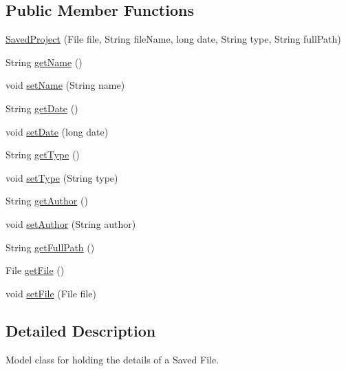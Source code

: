 \subsection*{Public Member Functions}
\begin{DoxyCompactItemize}
\item 
\hyperlink{classorg_1_1buildmlearn_1_1toolkit_1_1model_1_1SavedProject_adb8e49d8331062fbca7e82d88c636d5f}{Saved\-Project} (File file, String file\-Name, long date, String type, String full\-Path)
\item 
String \hyperlink{classorg_1_1buildmlearn_1_1toolkit_1_1model_1_1SavedProject_a80e2d2daf80abb1f4e896c681ecb93bc}{get\-Name} ()
\item 
void \hyperlink{classorg_1_1buildmlearn_1_1toolkit_1_1model_1_1SavedProject_a2e1f111a512798fb8b1acf992fcd5240}{set\-Name} (String name)
\item 
String \hyperlink{classorg_1_1buildmlearn_1_1toolkit_1_1model_1_1SavedProject_a1e9523ff7c4ef3db7829059215ff70de}{get\-Date} ()
\item 
void \hyperlink{classorg_1_1buildmlearn_1_1toolkit_1_1model_1_1SavedProject_a3b47ee46e4cbea68adee68b64c2ec079}{set\-Date} (long date)
\item 
String \hyperlink{classorg_1_1buildmlearn_1_1toolkit_1_1model_1_1SavedProject_a5f64a7ad50e81ee2757e986da3c4e0a8}{get\-Type} ()
\item 
void \hyperlink{classorg_1_1buildmlearn_1_1toolkit_1_1model_1_1SavedProject_a752a07c55de9337e3220a1ffdb4faf50}{set\-Type} (String type)
\item 
String \hyperlink{classorg_1_1buildmlearn_1_1toolkit_1_1model_1_1SavedProject_ae2d5fe5caab78e44afee598b57e758fd}{get\-Author} ()
\item 
void \hyperlink{classorg_1_1buildmlearn_1_1toolkit_1_1model_1_1SavedProject_a59a14f4cc86c7079a84c591177418e61}{set\-Author} (String author)
\item 
String \hyperlink{classorg_1_1buildmlearn_1_1toolkit_1_1model_1_1SavedProject_af5b8dd7b1537d22874905c305fa3698a}{get\-Full\-Path} ()
\item 
File \hyperlink{classorg_1_1buildmlearn_1_1toolkit_1_1model_1_1SavedProject_abb1361575d53240244c368ab3b18ffb8}{get\-File} ()
\item 
void \hyperlink{classorg_1_1buildmlearn_1_1toolkit_1_1model_1_1SavedProject_a38b605c92572817f27a18173277c253d}{set\-File} (File file)
\end{DoxyCompactItemize}


\subsection{Detailed Description}
Model class for holding the details of a Saved File. 

